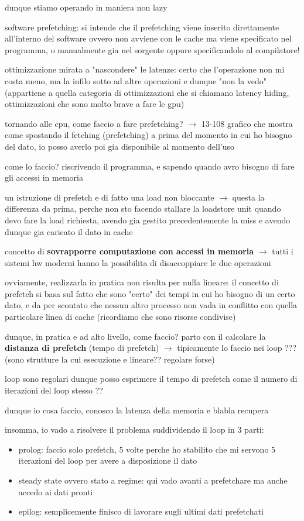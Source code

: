dunque stiamo operando in maniera non lazy

software prefetching: si intende che il prefetching viene inserito direttamente all'interno del software ovvero non avviene con le cache ma viene specificato nel programma, o manualmente gia nel sorgente oppure specificandolo al compilatore!

ottimizzazione mirata a "nascondere" le latenze: certo che l'operazione non mi costa meno, ma la infilo sotto ad altre operazioni e dunque "non la vedo" (appartiene a quella categoria di ottimizzazioni che si chiamano latency hiding, ottimizzazioni che sono molto brave a fare le gpu)

tornando alle cpu, come faccio a fare prefetching? $\rightarrow$ 13-108 grafico che mostra come spostando il fetching (prefetching) a prima del momento in cui ho bisogno del dato, io posso averlo poi gia disponibile al momento dell'uso

come lo faccio? riscrivendo il programma, e sapendo quando avro bisogno di fare gli accessi in memoria

un istruzione di prefetch e di fatto una load non bloccante $\rightarrow$ questa la differenza da prima, perche non sto facendo stallare la loadstore unit quando devo fare la load richiesta, avendo gia gestito precedentemente la miss e avendo dunque gia caricato il dato in cache

concetto di \textbf{sovrapporre computazione con accessi in memoria} $\rightarrow$ tutti i sistemi hw moderni hanno la possibilita di disaccoppiare le due operazioni

ovviamente, realizzarla in pratica non risulta per nulla lineare: il concetto di prefetch si basa sul fatto che sono "certo" dei tempi in cui ho bisogno di un certo dato, e da per scontato che nessun altro processo non vada in conflitto con quella particolare linea di cache (ricordiamo che sono risorse condivise)

dunque, in pratica e ad alto livello, come faccio? parto con il calcolare la \textbf{distanza di prefetch} (tempo di prefetch) $\rightarrow$ tipicamente lo faccio nei loop ??? (sono strutture la cui esecuzione e lineare?? regolare forse)

loop sono regolari dunque posso esprimere il tempo di prefetch come il numero di iterazioni del loop stesso ??

dunque io cosa faccio, conosco la latenza della memoria e blabla recupera

insomma, io vado a risolvere il problema suddividendo il loop in 3 parti: 
\begin{itemize}
  \item prolog: faccio solo prefetch, 5 volte perche ho stabilito che mi servono 5 iterazioni del loop per avere a disposizione il dato
  \item steady state ovvero stato a regime: qui vado avanti a prefetchare ma anche accedo ai dati pronti
  \item epilog: semplicemente finisco di lavorare sugli ultimi dati prefetchati
\end{itemize}

